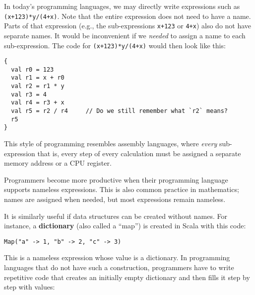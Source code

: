 In today\textsf{'}s programming languages, we may directly write expressions
such as \texttt{}\lstinline!(x+123)*y/(4+x)!. Note that the entire
expression does not need to have a name. Parts of that expression
(e.g., the sub-expressions \texttt{}\lstinline!x+123! or \lstinline!4+x!)
also do not have separate names. It would be inconvenient if we \emph{needed}
to assign a name to each sub-expression. The code for \lstinline!(x+123)*y/(4+x)!
would then look like this:

\begin{lstlisting}
{
  val r0 = 123
  val r1 = x + r0
  val r2 = r1 * y
  val r3 = 4 
  val r4 = r3 + x
  val r5 = r2 / r4     // Do we still remember what `r2` means?
  r5
}
\end{lstlisting}

This style of programming resembles assembly languages,
where \emph{every} sub-expression \textemdash{} that is, every step
of every calculation \textemdash{} must be assigned a separate memory
address or a CPU register.

Programmers become more productive when their programming language
supports nameless expressions. This is also common practice in mathematics;
names are assigned when needed, but most expressions remain nameless.

It is similarly useful if data structures can be created without names.
For instance, a \textbf{dictionary} (also called
a \textsf{``}map\textsf{''}) is created in Scala with this code:
\begin{lstlisting}
Map("a" -> 1, "b" -> 2, "c" -> 3)
\end{lstlisting}
This is a nameless expression whose value is a dictionary. In programming
languages that do not have such a construction, programmers have to
write repetitive code that creates an initially empty dictionary and
then fills it step by step with values:

